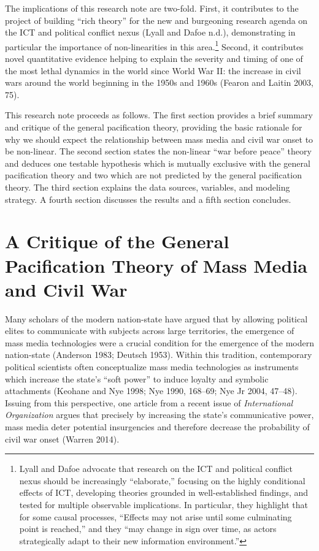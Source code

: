\documentclass[11pt,article,oneside]{memoir}
\begin{document}
The implications of this research note are two-fold. First, it
contributes to the project of building ``rich theory'' for the new and
burgeoning research agenda on the ICT and political conflict nexus
(Lyall and Dafoe n.d.), demonstrating in particular the importance of
non-linearities in this area.\footnote{Lyall and Dafoe advocate that
  research on the ICT and political conflict nexus should be
  increasingly ``elaborate,'' focusing on the highly conditional effects
  of ICT, developing theories grounded in well-established findings, and
  tested for multiple observable implications. In particular, they
  highlight that for some causal processes, ``Effects may not arise
  until some culminating point is reached,'' and they ``may change in
  sign over time, as actors strategically adapt to their new information
  environment.''} Second, it contributes novel quantitative evidence
helping to explain the severity and timing of one of the most lethal
dynamics in the world since World War II: the increase in civil wars
around the world beginning in the 1950s and 1960s (Fearon and Laitin
2003, 75).

This research note proceeds as follows. The first section provides a
brief summary and critique of the general pacification theory, providing
the basic rationale for why we should expect the relationship between
mass media and civil war onset to be non-linear. The second section
states the non-linear ``war before peace'' theory and deduces one
testable hypothesis which is mutually exclusive with the general
pacification theory and two which are not predicted by the general
pacification theory. The third section explains the data sources,
variables, and modeling strategy. A fourth section discusses the results
and a fifth section concludes.

\section{A Critique of the General Pacification Theory of Mass Media and
Civil
War}\label{a-critique-of-the-general-pacification-theory-of-mass-media-and-civil-war}

Many scholars of the modern nation-state have argued that by allowing
political elites to communicate with subjects across large territories,
the emergence of mass media technologies were a crucial condition for
the emergence of the modern nation-state (Anderson 1983; Deutsch 1953).
Within this tradition, contemporary political scientists often
conceptualize mass media technologies as instruments which increase the
state's ``soft power'' to induce loyalty and symbolic attachments
(Keohane and Nye 1998; Nye 1990, 168--69; Nye Jr 2004, 47--48). Issuing
from this perspective, one article from a recent issue of
\emph{International Organization} argues that precisely by increasing
the state's communicative power, mass media deter potential insurgencies
and therefore decrease the probability of civil war onset (Warren 2014).
\end{document}
